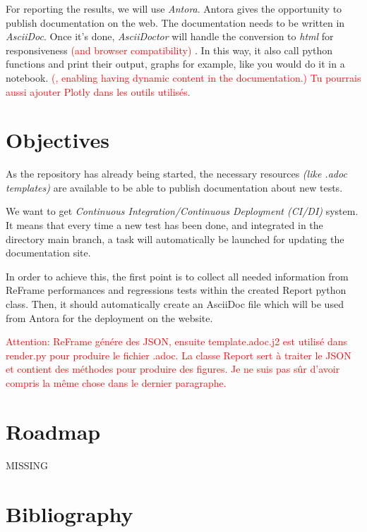 \documentclass[12pt]{article}
\begin{document}
For reporting the results, we will use \textit{Antora}\cite*{Antora}. Antora gives the opportunity to publish documentation on the web.
The documentation needs to be written in \textit{AsciiDoc}. Once it's done, \textit{AsciiDoctor} will handle the conversion to \textit{html}
for responsiveness \textcolor{red}{ (and browser compatibility) }.
In this way, it also call python functions and print their output, graphs for example, like you would do it in a notebook. \textcolor{red}{(, enabling having dynamic content in the documentation.)}
\textcolor{red}{
    Tu pourrais aussi ajouter Plotly dans les outils utilisés.
}

\newpage
\section{Objectives}
As the repository has already being started, the necessary resources \textit{(like .adoc templates)} are available
to be able to publish documentation about new tests.

We want to get \textit{Continuous Integration/Continuous Deployment (CI/DI)} system.
It means that every time a new test has been done, and integrated in the directory main branch, a task will 
automatically be launched for updating the documentation site.

In order to achieve this, the first point is to collect all needed information from ReFrame performances and regressions tests
within the created Report python class. Then, it should automatically create an AsciiDoc file which will be used from Antora
for the deployment on the website.

\textcolor{red}{
    Attention: ReFrame génére des JSON, ensuite template.adoc.j2 est utilisé dans render.py pour produire le fichier .adoc.
    La classe Report sert à traiter le JSON et contient des méthodes pour produire des figures. Je ne suis pas sûr d'avoir compris la même chose dans le dernier paragraphe.
}



\newpage
\section{Roadmap}
MISSING

\newpage
\section{Bibliography}
\nocite{*}
\printbibliography[heading=none]
\end{document}
